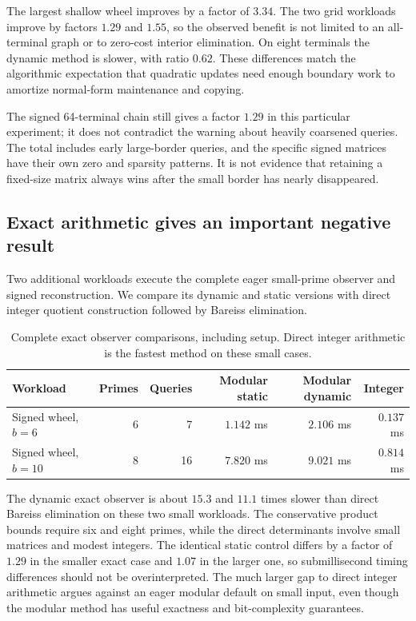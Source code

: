 \documentclass[11pt,letterpaper]{article}
\theoremstyle{definition}\newtheorem{definition}[theorem]{Definition}
\theoremstyle{remark}\newtheorem{remark}[theorem]{Remark}
\begin{document}
The largest shallow wheel improves by a factor of $3.34$. The two grid workloads improve by factors $1.29$ and $1.55$, so the observed benefit is not limited to an all-terminal graph or to zero-cost interior elimination. On eight terminals the dynamic method is slower, with ratio $0.62$. These differences match the algorithmic expectation that quadratic updates need enough boundary work to amortize normal-form maintenance and copying.

The signed 64-terminal chain still gives a factor $1.29$ in this particular experiment; it does not contradict the warning about heavily coarsened queries. The total includes early large-border queries, and the specific signed matrices have their own zero and sparsity patterns. It is not evidence that retaining a fixed-size matrix always wins after the small border has nearly disappeared.

\subsection{Exact arithmetic gives an important negative result}
Two additional workloads execute the complete eager small-prime observer and signed reconstruction. We compare its dynamic and static versions with direct integer quotient construction followed by Bareiss elimination.

\begin{table}[htbp]
\centering
\begin{tabular}{lrrrrr}
\toprule
Workload & Primes & Queries & Modular static & Modular dynamic & Integer\\
\midrule
Signed wheel, $b=6$ & 6 & 7 & $1.142$ ms & $2.106$ ms & $0.137$ ms\\
Signed wheel, $b=10$ & 8 & 16 & $7.820$ ms & $9.021$ ms & $0.814$ ms\\
\bottomrule
\end{tabular}
\caption{Complete exact observer comparisons, including setup. Direct integer arithmetic is the fastest method on these small cases.}
\label{tab:exact}
\end{table}

The dynamic exact observer is about $15.3$ and $11.1$ times slower than direct Bareiss elimination on these two small workloads. The conservative product bounds require six and eight primes, while the direct determinants involve small matrices and modest integers. The identical static control differs by a factor of $1.29$ in the smaller exact case and $1.07$ in the larger one, so submillisecond timing differences should not be overinterpreted. The much larger gap to direct integer arithmetic argues against an eager modular default on small input, even though the modular method has useful exactness and bit-complexity guarantees.
\end{document}
